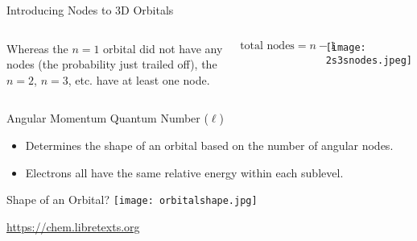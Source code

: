 \documentclass[handout,notes=hide]{beamer}
\begin{document}
\begin{frame}{Introducing Nodes to 3D Orbitals}
	\begin{columns}
		Whereas the $n = 1$ orbital did not have any nodes (the probability
		just trailed off), the $n = 2$, $n = 3$, etc. have \alert{at least} one
		node.

			\begin{equation*}
				\text{total nodes} = n - 1
			\end{equation*}

		\centering
		\texttt{[image: 2s3snodes.jpeg]}
	\end{columns}
\end{frame}

\begin{frame}[t]{Angular Momentum Quantum Number ($\ell$)}
	\begin{itemize}
		\item Determines the \alert{shape} of an orbital based on the
			number of \alert{angular nodes}.
		\item Electrons all have the same relative energy within each
			\alert{sublevel}.
	\end{itemize}
\end{frame}

\begin{frame}{Shape of an Orbital?}
	\centering
	\texttt{[image: orbitalshape.jpg]}

	\footnotesize \url{https://chem.libretexts.org}
\end{frame}
\end{document}
